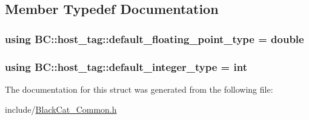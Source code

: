 \subsection{Member Typedef Documentation}
\subsubsection[{\texorpdfstring{default\+\_\+floating\+\_\+point\+\_\+type}{default_floating_point_type}}]{\setlength{\rightskip}{0pt plus 5cm}using {\bf B\+C\+::host\+\_\+tag\+::default\+\_\+floating\+\_\+point\+\_\+type} =  double}\hypertarget{structBC_1_1host__tag_adda3346115c9b8bd51b8d876c4138399}{}\label{structBC_1_1host__tag_adda3346115c9b8bd51b8d876c4138399}
\subsubsection[{\texorpdfstring{default\+\_\+integer\+\_\+type}{default_integer_type}}]{\setlength{\rightskip}{0pt plus 5cm}using {\bf B\+C\+::host\+\_\+tag\+::default\+\_\+integer\+\_\+type} =  int}\hypertarget{structBC_1_1host__tag_abb939b426fa8dfb7c63f593e7ee66d62}{}\label{structBC_1_1host__tag_abb939b426fa8dfb7c63f593e7ee66d62}


The documentation for this struct was generated from the following file\+:\begin{DoxyCompactItemize}
\item 
include/\hyperlink{BlackCat__Common_8h}{Black\+Cat\+\_\+\+Common.\+h}\end{DoxyCompactItemize}
